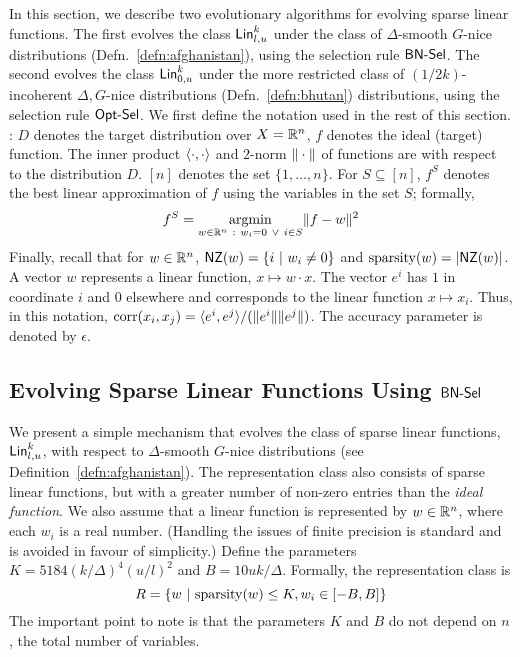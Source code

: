 In this section, we describe two evolutionary algorithms for evolving sparse
linear functions. The first evolves the class $\mathsf{Lin}^k_{l, u}$ under the class of
$\Delta$-smooth $G$-nice distributions (Defn.~\ref{defn:afghanistan}), using the
selection rule $\mathsf{BN\mbox{-}Sel}$. The second evolves the class $\mathsf{Lin}^k_{0, u}$ under the
more restricted class of $(1/2k)$-incoherent $\Delta, G$-nice distributions
(Defn.~\ref{defn:bhutan}) distributions, using the selection rule $\mathsf{Opt\mbox{-}Sel}$. We
first define the notation used in the rest of this section.\smallskip \\

: $D$ denotes the target distribution over $X =
\mathbb{R}^n$, $f$ denotes the ideal (target) function. The inner product
$\langle \cdot, \cdot \rangle$ and $2$-norm $\Vert \cdot \Vert$ of functions are with
respect to the distribution $D$. $[n]$ denotes the set $\{1, \ldots, n\}$. For
$S \subseteq [n]$, $f^S$ denotes the best linear approximation of $f$ using the
variables in the set $S$; formally,
\begin{align}
f^S = \underset{w \in \mathbb{R}^n~:~ w_i = 0 ~\vee~i \in S}{\mathrm{argmin}} \Vert f -
w \Vert^2 \label{eqn:artichoke}
\end{align}
Finally, recall that for $w \in \mathbb{R}^n$, $\mathsf{NZ}(w) = \{i ~|~ w_i \neq 0 \}$ and
$\mathrm{sparsity}(w) = |\mathsf{NZ}(w)|$. A vector $w$ represents a linear function, $x \mapsto
w \cdot x$. The vector $e^i$ has $1$ in coordinate $i$ and $0$ elsewhere and
corresponds to the linear function $x \mapsto x_i$. Thus, in this notation,
$\mathrm{corr}(x_i, x_j) = \langle e^i, e^j \rangle/(\Vert e^i \Vert\Vert e^j \Vert)$. The accuracy
parameter is denoted by $\epsilon$. 

\subsection{Evolving Sparse Linear Functions Using $\mathsf{BN\mbox{-}Sel}$}
\label{sec:sparse_linear}

We present a simple mechanism that evolves the class of sparse linear functions,
$\mathsf{Lin}^k_{l, u}$, with respect to $\Delta$-smooth $G$-nice distributions (see
Definition~\ref{defn:afghanistan}). The representation class also consists of
sparse linear functions, but with a greater number of non-zero entries than the
\emph{ideal function}. We also assume that a linear function is represented by
$w \in \mathbb{R}^n$, where each $w_i$ is a real number. (Handling the issues of
finite precision is standard and is avoided in favour of simplicity.) Define the
parameters $K = 5184(k/\Delta)^4(u/l)^2$ and $B = 10 uk /\Delta$. Formally, the
representation class is
\[ 
R = \{ w ~|~ \mathrm{sparsity}(w) \leq K, w_i \in [-B, B] \}
\]
The important point to note is that the parameters $K$ and $B$ do not depend on
$n$, the total number of variables.


